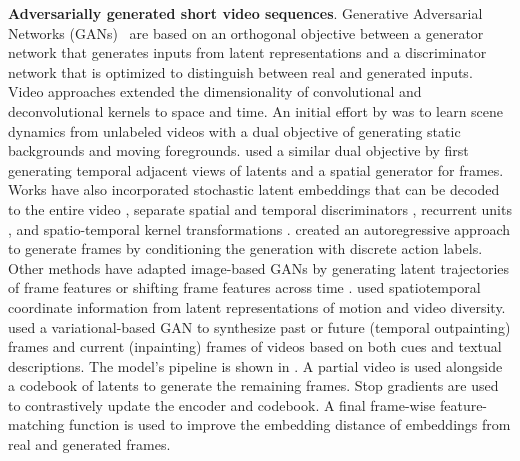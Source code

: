\noindent
\textbf{Adversarially generated short video sequences}. Generative Adversarial Networks (GANs)~\citep{goodfellow2014generative} are based on an orthogonal objective between a generator network that generates inputs from latent representations and a discriminator network that is optimized to distinguish between real and generated inputs. Video approaches extended the dimensionality of convolutional and deconvolutional kernels to space and time. An initial effort by \citet{vondrick2016generating} was to learn scene dynamics from unlabeled videos with a dual objective of generating static backgrounds and moving foregrounds. \citet{saito2017temporal} used a similar dual objective by first generating temporal adjacent views of latents and a spatial generator for frames. Works have also incorporated stochastic latent embeddings that can be decoded to the entire video \citep{lee2018stochastic}, separate spatial and temporal discriminators \citep{clark2019adversarial}, recurrent units \citep{gupta2022rv,wang2023styleinv}, and spatio-temporal kernel transformations \citep{luc2020transformation}. \citet{menapace2021playable} created an autoregressive approach to generate frames by conditioning the generation with discrete action labels. Other methods have adapted image-based GANs by generating latent trajectories of frame features \citep{tian2021good} or shifting frame features across time \citep{munoz2021temporal}. \citet{yu2022generating} used spatiotemporal coordinate information from latent representations of motion and video diversity. \citet{fu2023tell} used a variational-based GAN \citep{esser2021taming} to synthesize past or future (temporal outpainting) frames and current (inpainting) frames of videos based on both cues and textual descriptions. The model's pipeline is shown in . A partial video is used alongside a codebook of latents to generate the remaining frames. Stop gradients are used to contrastively update the encoder and codebook. A final frame-wise feature-matching function is used to improve the embedding distance of embeddings from real and generated frames. 

